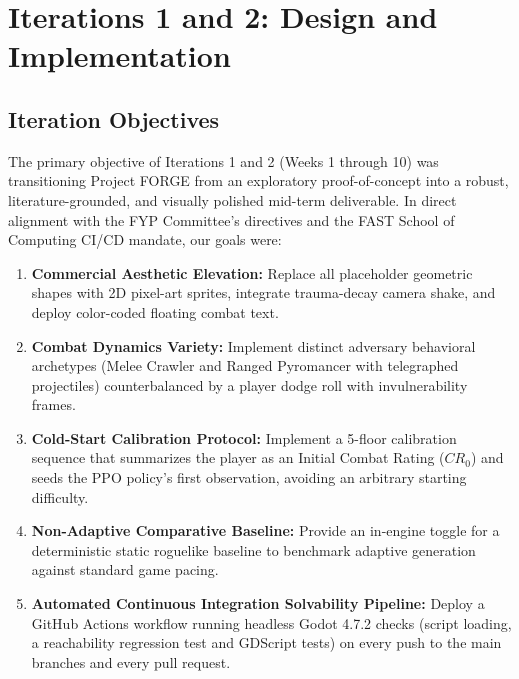 \chapter{Iterations 1 and 2: Design and Implementation}
\label{chap:iter1}

\section{Iteration Objectives}
The primary objective of Iterations 1 and 2 (Weeks 1 through 10) was transitioning Project FORGE from an exploratory proof-of-concept into a robust, literature-grounded, and visually polished mid-term deliverable. In direct alignment with the FYP Committee's directives and the FAST School of Computing CI/CD mandate, our goals were:
\begin{enumerate}
    \item \textbf{Commercial Aesthetic Elevation:} Replace all placeholder geometric shapes with 2D pixel-art sprites, integrate trauma-decay camera shake, and deploy color-coded floating combat text.
    \item \textbf{Combat Dynamics Variety:} Implement distinct adversary behavioral archetypes (Melee Crawler and Ranged Pyromancer with telegraphed projectiles) counterbalanced by a player dodge roll with invulnerability frames.
    \item \textbf{Cold-Start Calibration Protocol:} Implement a 5-floor calibration sequence that summarizes the player as an Initial Combat Rating ($CR_0$) and seeds the PPO policy's first observation, avoiding an arbitrary starting difficulty.
    \item \textbf{Non-Adaptive Comparative Baseline:} Provide an in-engine toggle for a deterministic static roguelike baseline to benchmark adaptive generation against standard game pacing.
    \item \textbf{Automated Continuous Integration Solvability Pipeline:} Deploy a GitHub Actions workflow running headless Godot 4.7.2 checks (script loading, a reachability regression test and GDScript tests) on every push to the main branches and every pull request.
\end{enumerate}

